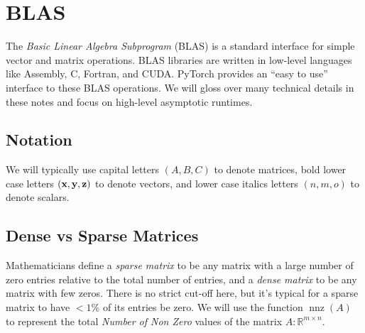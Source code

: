 \documentclass[10pt]{article}
\theoremstyle{definition}
\newcommand{\R}{\mathbb R}
\DeclareMathOperator{\nnz}{nnz}
\begin{document}

\newpage
\section{BLAS}

The \emph{Basic Linear Algebra Subprogram} (BLAS) is a standard interface for simple vector and matrix operations.
BLAS libraries are written in low-level languages like Assembly, C, Fortran, and CUDA.
PyTorch provides an ``easy to use'' interface to these BLAS operations.
We will gloss over many technical details in these notes and focus on high-level asymptotic runtimes.

\subsection{Notation}

We will typically use capital letters $(A, B, C)$ to denote matrices,
bold lower case letters $(\textbf x, \textbf y, \textbf z)$ to denote vectors,
and lower case italics letters $(n, m, o)$ to denote scalars.

\subsection{Dense vs Sparse Matrices}

Mathematicians define a \emph{sparse matrix} to be any matrix with a large number of zero entries relative to the total number of entries,
and a \emph{dense matrix} to be any matrix with few zeros.
There is no strict cut-off here, but it's typical for a sparse matrix to have $< 1\%$ of its entries be zero.
We will use the function $\nnz(A)$ to represent the total \emph{Number of Non Zero} values of the matrix $A:\R^{m\times n}$.
\end{document}
